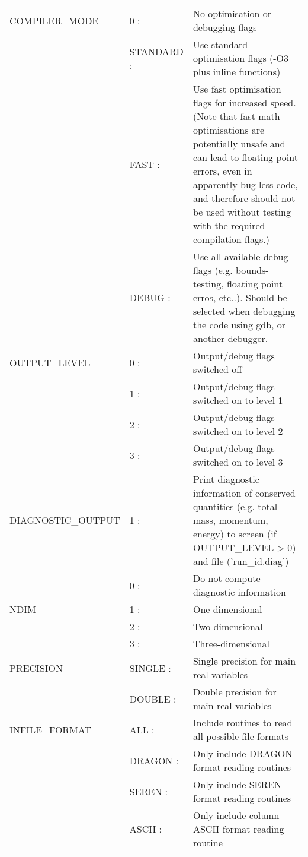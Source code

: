 \documentclass[a4paper]{article}
\begin{document}
\begin{center}
\begin{supertabular}{|p{4.6cm}|p{4.6cm} p{6.4cm}|}
 COMPILER\_MODE & 0 :& No optimisation or debugging flags \\
               & STANDARD :& Use standard optimisation flags (-O3 plus inline functions) \\
               & FAST     :& Use fast optimisation flags for increased speed.  (Note that fast math optimisations are potentially unsafe and can lead to floating point errors, even in apparently bug-less code, and therefore should not be used without testing with the required compilation flags.) \\
               & DEBUG    :& Use all available debug flags (e.g. bounds-testing, floating point erros, etc..).  Should be selected when debugging the code using gdb, or another debugger. \\ \hline

 OUTPUT\_LEVEL & 0 :& Output/debug flags switched off \\
               & 1 :& Output/debug flags switched on to level 1 \\
               & 2 :& Output/debug flags switched on to level 2 \\
               & 3 :& Output/debug flags switched on to level 3 \\ \hline

 DIAGNOSTIC\_OUTPUT & 1 :& Print diagnostic information of conserved quantities (e.g. total mass, momentum, energy) to screen (if OUTPUT\_LEVEL > 0) and file ('run\_id.diag') \\
                    & 0 :& Do not compute diagnostic information \\ \hline

 NDIM          & 1 :& One-dimensional \\
               & 2 :& Two-dimensional \\
               & 3 :& Three-dimensional \\ \hline

 PRECISION     & SINGLE :& Single precision for main real variables \\
               & DOUBLE :& Double precision for main real variables \\ \hline

 INFILE\_FORMAT & ALL       :& Include routines to read all possible file formats \\
                & DRAGON    :& Only include DRAGON-format reading routines \\
                & SEREN     :& Only include SEREN-format reading routines \\
                & ASCII     :& Only include column-ASCII format reading routine \\ \hline


\end{supertabular}
\end{center}
\end{document}
